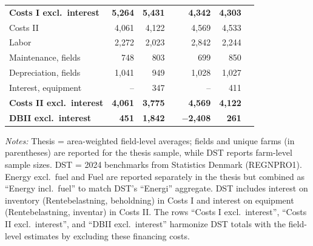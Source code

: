 \documentclass[12pt]{article}
\begin{document}
\begin{table}[htbp]
\begin{threeparttable}
\begin{tabular}{lrrrrrr}
\textbf{Costs I excl.\ interest}  
& \textbf{5,264} & \textbf{5,431} & &
  \textbf{4,342} & \textbf{4,303} \\
\addlinespace

Costs II                          &       4,061 &  4,122 & &       4,569 &  4,533 \\
\quad Labor                       &       2,272 &  2,023 & &       2,842 &  2,244 \\
\quad Maintenance, fields         &         748 &    803 & &         699 &    850 \\
\quad Depreciation, fields        &       1,041 &    949 & &       1,028 &  1,027 \\
\quad Interest, equipment         &          -- &    347 & &          -- &    411 \\
\addlinespace

\textbf{Costs II excl.\ interest} 
& \textbf{4,061} & \textbf{3,775} & &
  \textbf{4,569} & \textbf{4,122} \\
\addlinespace

\midrule
\textbf{DBII excl.\ interest}     
& \textbf{451} & \textbf{1,842} & &
  \textbf{$-$2,408} & \textbf{261} \\
\bottomrule
\end{tabular}

\begin{tablenotes}
\footnotesize
\item \textit{Notes:} Thesis = area-weighted field-level averages; fields and unique farms
(in parentheses) are reported for the thesis sample, while DST reports farm-level sample
sizes. DST = 2024 benchmarks from Statistics Denmark (REGNPRO1). Energy excl.\ fuel and
Fuel are reported separately in the thesis but combined as ``Energy incl.\ fuel'' to match
DST's ``Energi'' aggregate. DST includes interest on inventory
(Rentebelastning, beholdning) in Costs I and interest on equipment
(Rentebelastning, inventar) in Costs II. The rows ``Costs I excl.\ interest'',
``Costs II excl.\ interest'', and ``DBII excl.\ interest'' harmonize DST totals
with the field-level estimates by excluding these financing costs.
\end{tablenotes}

\end{threeparttable}
\end{table}  
\end{document}
